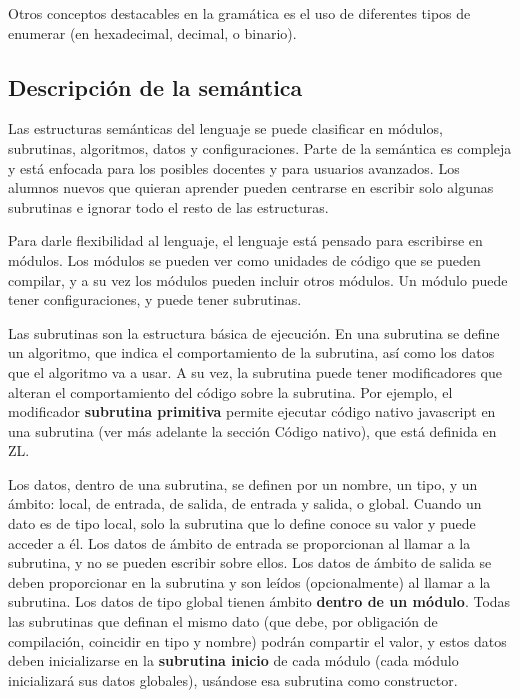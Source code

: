 \documentclass{report}
\begin{document}
	\vspace{10px}
		
	Otros conceptos destacables en la gramática es el uso de diferentes tipos de enumerar (en hexadecimal, decimal, o binario). 
	
	\subsection{Descripción de la semántica}
	
	Las estructuras semánticas del lenguaje se puede clasificar en módulos, subrutinas, algoritmos, datos y configuraciones. Parte de la semántica es compleja y está enfocada para los posibles docentes y para usuarios avanzados. Los alumnos nuevos que quieran aprender pueden centrarse en escribir solo algunas subrutinas e ignorar todo el resto de las estructuras.
	
	\vspace{10px}
	
	Para darle flexibilidad al lenguaje, el lenguaje está pensado para escribirse en módulos. Los módulos se pueden ver como unidades de código que se pueden compilar, y a su vez los módulos pueden incluir otros módulos. Un módulo puede tener configuraciones, y puede tener subrutinas. 
	
	\vspace{10px}
	
	Las subrutinas son la estructura básica de ejecución. En una subrutina se define un algoritmo, que indica el comportamiento de la subrutina, así como los datos que el algoritmo va a usar. A su vez, la subrutina puede tener modificadores que alteran el comportamiento del código sobre la subrutina. Por ejemplo, el modificador \textbf{subrutina primitiva} permite ejecutar código nativo javascript en una subrutina (ver más adelante la sección Código nativo), que está definida en ZL.
	
	\vspace{10px}
	
	Los datos, dentro de una subrutina, se definen por un nombre, un tipo, y un ámbito: local, de entrada, de salida, de entrada y salida, o global. Cuando un dato es de tipo local, solo la subrutina que lo define conoce su valor y puede acceder a él. Los datos de ámbito de entrada se proporcionan al llamar a la subrutina, y no se pueden escribir sobre ellos. Los datos de ámbito de salida se deben proporcionar en la subrutina y son leídos (opcionalmente) al llamar a la subrutina. Los datos de tipo global tienen ámbito \textbf{dentro de un módulo}. Todas las subrutinas que definan el mismo dato (que debe, por obligación de compilación, coincidir en tipo y nombre) podrán compartir el valor, y estos datos deben inicializarse en la \textbf{subrutina inicio} de cada módulo (cada módulo inicializará sus datos globales), usándose esa subrutina como constructor. 
	
\end{document}
